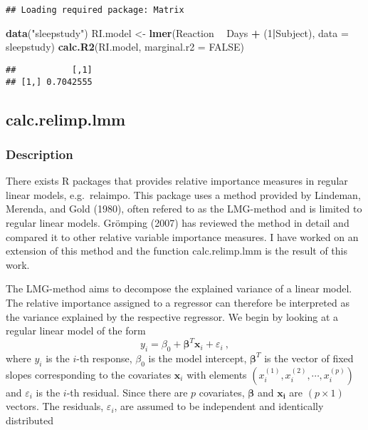 \documentclass[
]{article}
\newenvironment{Shaded}{\begin{snugshade}}{\end{snugshade}}
\newcommand{\DataTypeTok}[1]{\textcolor[rgb]{0.13,0.29,0.53}{#1}}
\newcommand{\DecValTok}[1]{\textcolor[rgb]{0.00,0.00,0.81}{#1}}
\newcommand{\KeywordTok}[1]{\textcolor[rgb]{0.13,0.29,0.53}{\textbf{#1}}}
\newcommand{\NormalTok}[1]{#1}
\newcommand{\OperatorTok}[1]{\textcolor[rgb]{0.81,0.36,0.00}{\textbf{#1}}}
\newcommand{\OtherTok}[1]{\textcolor[rgb]{0.56,0.35,0.01}{#1}}
\newcommand{\StringTok}[1]{\textcolor[rgb]{0.31,0.60,0.02}{#1}}
\begin{document}
\begin{verbatim}
## Loading required package: Matrix
\end{verbatim}

\begin{Shaded}
\begin{Highlighting}[]
\KeywordTok{data}\NormalTok{(}\StringTok{"sleepstudy"}\NormalTok{)}
\NormalTok{RI.model <-}\StringTok{ }\KeywordTok{lmer}\NormalTok{(Reaction }\OperatorTok{~}\StringTok{ }\NormalTok{Days }\OperatorTok{+}\StringTok{ }\NormalTok{(}\DecValTok{1}\OperatorTok{|}\NormalTok{Subject), }\DataTypeTok{data =}\NormalTok{ sleepstudy)}
\KeywordTok{calc.R2}\NormalTok{(RI.model, }\DataTypeTok{marginal.r2 =} \OtherTok{FALSE}\NormalTok{)}
\end{Highlighting}
\end{Shaded}

\begin{verbatim}
##           [,1]
## [1,] 0.7042555
\end{verbatim}

\hypertarget{calc.relimp.lmm}{%
\subsection{calc.relimp.lmm}\label{calc.relimp.lmm}}

\hypertarget{description-1}{%
\subsubsection{Description}\label{description-1}}

There exists R packages that provides relative importance measures in
regular linear models, e.g.~relaimpo. This package uses a method
provided by Lindeman, Merenda, and Gold (1980), often refered to as the
LMG-method and is limited to regular linear models. Grömping (2007) has
reviewed the method in detail and compared it to other relative variable
importance measures. I have worked on an extension of this method and
the function calc.relimp.lmm is the result of this work.

The LMG-method aims to decompose the explained variance of a linear
model. The relative importance assigned to a regressor can therefore be
interpreted as the variance explained by the respective regressor. We
begin by looking at a regular linear model of the form \begin{equation}
    y_i = \beta_0 + \boldsymbol{\beta}^T\boldsymbol{x}_i +\varepsilon_i \ ,
    \label{regular_LM}
\end{equation} where \(y_i\) is the \(i\)-th response, \(\beta_0\) is
the model intercept, \(\boldsymbol{\beta}^T\) is the vector of fixed
slopes corresponding to the covariates \(\boldsymbol{x}_i\) with
elements \((x_{i}^{(1)},x_{i}^{(2)},\cdots,x_{i}^{(p)})\) and
\(\varepsilon_i\) is the \(i\)-th residual. Since there are \(p\)
covariates, \(\boldsymbol{\beta}\) and \(\boldsymbol{x_i}\) are
\((p \times 1)\) vectors. The residuals, \(\varepsilon_i\), are assumed
to be independent and identically distributed
\end{document}
